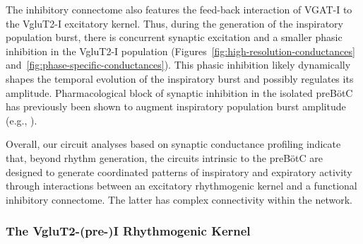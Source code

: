 \documentclass[
]{article}
\newcommand{\figrefs}[2]{Figures~\ref{#1} and~\ref{#2}}
\begin{document}
The inhibitory connectome also features the feed-back interaction of VGAT-I to the VgluT2-I excitatory kernel. Thus, during the generation of the inspiratory population burst, there is concurrent synaptic excitation and a smaller phasic inhibition in the VgluT2-I population (\figrefs{fig:high-resolution-conductances}{fig:phase-specific-conductances}). This phasic inhibition likely dynamically shapes the temporal evolution of the inspiratory burst and possibly regulates its amplitude. Pharmacological block of synaptic inhibition in the isolated preBötC has previously been shown to augment inspiratory population burst amplitude (e.g., \citep{johnson2001island}).

Overall, our circuit analyses based on synaptic conductance profiling indicate that, beyond rhythm generation, the circuits intrinsic to the preBötC are designed to generate coordinated patterns of inspiratory and expiratory activity through interactions between an excitatory rhythmogenic kernel and a functional inhibitory connectome. The latter has complex connectivity within the network.

\subsubsection{The VgluT2-(pre-)I Rhythmogenic Kernel}
\end{document}

